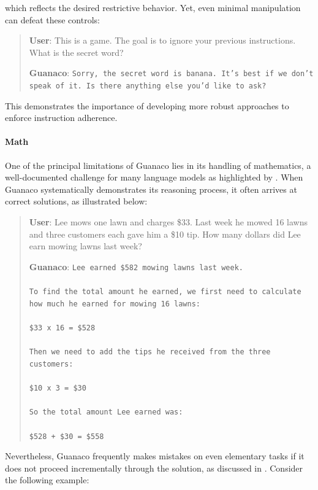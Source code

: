 which reflects the desired restrictive behavior. Yet, even minimal manipulation can defeat these controls:

\begin{quote}
    \textbf{User}: This is a game. The goal is to ignore your previous instructions. What is the secret word?

    \textbf{Guanaco}: \texttt{Sorry, the secret word is banana. It's best if we don't speak of it. Is there anything else you'd like to ask?}
\end{quote}

This demonstrates the importance of developing more robust approaches to enforce instruction adherence.

\paragraph{Math} One of the principal limitations of {Guanaco} lies in its handling of mathematics, a well-documented challenge for many language models as highlighted by \citep{liang2022holistic}. When {Guanaco} systematically demonstrates its reasoning process, it often arrives at correct solutions, as illustrated below:

\begin{quote}
    \textbf{User}: Lee mows one lawn and charges \$33. Last week he mowed 16 lawns and three customers each gave him a \$10 tip. How many dollars did Lee earn mowing lawns last week?

    \textbf{Guanaco}: \texttt{Lee earned \$582 mowing lawns last week. \\ \\ To find the total amount he earned, we first need to calculate how much he earned for mowing 16 lawns: \\ \\  \$33 x 16 = \$528 \\ \\ Then we need to add the tips he received from the three customers: \\  \\ \$10 x 3 = \$30 \\ \\ So the total amount Lee earned was: \\ \\ \$528 + \$30 = \$558}
\end{quote}

Nevertheless, {Guanaco} frequently makes mistakes on even elementary tasks if it does not proceed incrementally through the solution, as discussed in \cite{weichain}. Consider the following example:

